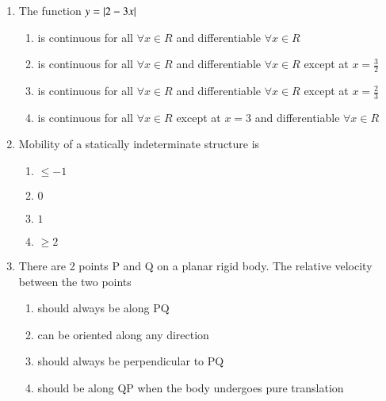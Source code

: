 \documentclass[journal]{IEEEtran}
\begin{document}
\begin{enumerate}
		\begin{multicols}{4}
			\begin{enumerate}
				\item $5$
				\item $\sqrt{5}$
				\item $\frac{1}{\sqrt{5}}$
				\item $\frac{1}{5}$
			\end{enumerate}
		\end{multicols}

    \item The function $y=\left\vert2-3x\right\vert$

       \begin{enumerate}
            \item is continuous for all $\forall x\in R$ and differentiable $\forall x\in R$
            \item is continuous for all $\forall x\in R$ and differentiable $\forall x\in R$ except at $x=\frac{3}{2}$
            \item is continuous for all $\forall x\in R$ and differentiable $\forall x\in R$ except at $x=\frac{2}{3}$
            \item is continuous for all $\forall x\in R$ except at $x=3$ and differentiable $\forall x\in R$
        \end{enumerate}
  
    \item Mobility of a statically indeterminate structure is

    \begin{multicols}{4}
        \begin{enumerate}
            \item $\leq -1$
            \item $0$
            \item $1$
            \item $\geq2$
        \end{enumerate}
    \end{multicols}

    \item There are 2 points P and Q on a planar rigid body. The relative velocity between the two points 

        
            \begin{enumerate}
                \item should always be along PQ
                \item can be oriented along any direction
                \item should always be perpendicular to PQ
                \item should be along QP when the body undergoes pure translation
            \end{enumerate}
        

\end{enumerate}
\end{document}
